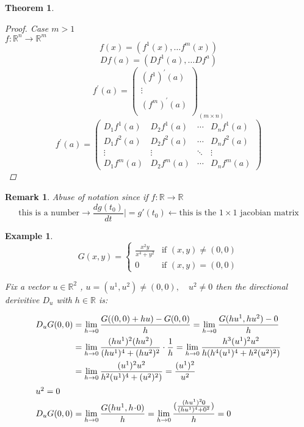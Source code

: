 \documentclass[12pt]{article}
\def\RR{\mathbb{R}}
\newtheorem{theorem}{Theorem}[section]
\newtheorem{example}{Example}[section]
\newtheorem*{remark}{Remark}
\begin{document}
\begin{theorem}
\begin{proof}
Case $m>1 $\\
$f:\RR^n \rightarrow \RR^m $
\[f(x) = (f^{1} (x), \dots f^{m}(x))\]
\[Df(a) = (Df^{1} (a), \dots Df^{a})\]
\[ f^{'}(a) = \begin{pmatrix}
  (f^1)^{'}(a) \\
  \vdots\\
(f^m)^{'}(a)\\
 \end{pmatrix}_{(m \times n)}\]
\[ f^{'}(a) = \begin{pmatrix}
  D_{1}f^{1}(a) & D_{2}f^{1}(a) & \cdots &D_{n}f^{1}(a) \\
  D_{1}f^{2}(a) & D_{2}f^{2}(a) & \cdots & D_{n}f^{2}(a) \\
  \vdots  & \vdots  & \ddots & \vdots  \\
  D_{1}f^{m}(a) & D_{2}f^{m}(a) & \cdots & D_{n}f^{m}(a)
 \end{pmatrix}\]
\end{proof}
\end{theorem}

\begin{remark}
Abuse of notation since if $f:\RR \rightarrow \RR$
\[\text{this is a number} \rightarrow  \frac{dg(t_{0})}{dt}| = g'(t_{0}) \leftarrow \text{this is the $1 \times 1$ jacobian matrix}\]
\end{remark}

\begin{example}
\[ G(x,y) =
  \begin{cases}
   \frac{x^{2}y}{x^{4} + y^{2}} & \text{if } (x,y) \neq (0,0) \\
   0       & \text{if } (x,y) = (0,0)
  \end{cases}\]

Fix a vector $u \in \RR^2$ , $u=(u^1 , u^2 ) \neq (0,0), \quad u^2 \neq 0$ then the directional derivitive $D_{u}$ with $h \in \RR$ is:

\begin{align*}
D_{u}G(0,0) &= \lim_{h \rightarrow 0}\frac{G((0,0) + hu) - G(0,0)}{h} =  \lim_{h \rightarrow 0}\frac{G(hu^1 , hu^2 ) - 0}{h}\\
&= \lim_{h \rightarrow 0}\frac{(hu^1)^2(hu^2)}{(hu^1)^4 + (hu^2)^2} \cdot \frac{1}{h} =   \lim_{h \rightarrow 0}\frac{h^3 (u^1)^2 u^2}{h(h^4(u^1)^4 + h^2(u^2)^2)}\\
&=  \lim_{h \rightarrow 0}\frac{ (u^1)^2 u^2}{h^2(u^1)^4 + (u^2)^2)} = \frac{(u^1)^2}{u^2}\\
\shortintertext{$u^2=0$}
D_{u}G(0,0) &=  \lim_{h \rightarrow 0}\frac{G(hu^1 , h \! \cdot \!0)}{h}=  \lim_{h \rightarrow 0}\frac{(\frac{(hu^1)^2 \! \cdot \! 0}{(hu^1)^4 + 0^2})}{h} = 0
\end{align*}




\end{example}
\end{document}
